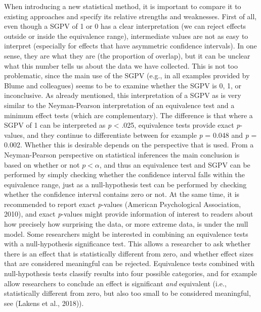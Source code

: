 \documentclass[,man,floatsintext]{apa6}
\begin{document}
When introducing a new statistical method, it is important to compare it
to existing approaches and specify its relative strengths and
weaknesses. First of all, even though a SGPV of 1 or 0 has a clear
interpretation (we can reject effects outside or inside the equivalence
range), intermediate values are not as easy to interpret (especially for
effects that have asymmetric confidence intervals). In one sense, they
are what they are (the proportion of overlap), but it can be unclear
what this number tells us about the data we have collected. This is not
too problematic, since the main use of the SGPV (e.g., in all examples
provided by Blume and colleagues) seems to be to examine whether the
SGPV is 0, 1, or inconclusive. As already mentioned, this interpretation
of a SGPV as is very similar to the Neyman-Pearson interpretation of an
equivalence test and a minimum effect tests (which are complementary).
The difference is that where a SGPV of 1 can be interpreted as \emph{p}
\textless{} .025, equivalence tests provide exact \emph{p}-values, and
they continue to differentiate between for example \emph{p} = 0.048 and
\emph{p} = 0.002. Whether this is desirable depends on the perspective
that is used. From a Neyman-Pearson perspective on statistical
inferences the main conclusion is based on whether or not
\(p < \alpha\), and thus an equivalence test and SGPV can be performed
by simply checking whether the confidence interval falls within the
equivalence range, just as a null-hypothesis test can be performed by
checking whether the confidence interval contains zero or not. At the
same time, it is recommended to report exact \emph{p}-values (American
Psychological Association, 2010), and exact \emph{p}-values might
provide information of interest to readers about how precisely how
surprising the data, or more extreme data, is under the null model. Some
researchers might be interested in combining an equivalence tests with a
null-hypothesis significance test. This allows a researcher to ask
whether there is an effect that is statistically different from zero,
and whether effect sizes that are considered meaningful can be rejected.
Equivalence tests combined with null-hypothesis tests classify results
into four possible categories, and for example allow researchers to
conclude an effect is significant \emph{and} equivalent (i.e.,
statistically different from zero, but also too small to be considered
meaningful, see (Lakens et al., 2018)).
\end{document}
